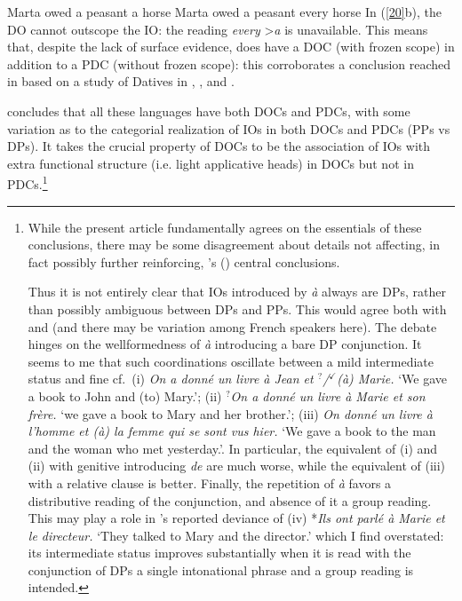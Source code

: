 \documentclass[output=paper]{langsci/langscibook}
\begin{document}
\ea \label{20}
    \ea Marta owed a peasant a horse
    \ex Marta owed a peasant every horse
    \z
\z
%
In (\ref{20}b), the DO cannot outscope the IO: the reading {\it every}
\textgreater {\it a} is unavailable. This means that, despite the lack of
surface evidence,   does have a \gls{DOC} (with frozen scope) in addition to a
    \gls{PDC} (without frozen scope):
    this corroborates a conclusion  reached in \cite{anagnostopoulou2005cross}
    based on a study of Datives in , , 
    and .\largerpage[-4]

\cite{anagnostopoulou2005cross} concludes that all these  languages have both
\glspl{DOC} and \glspl{PDC}, with some variation as to the categorial
realization of \glspl{IO} in both \glspl{DOC} and \glspl{PDC} (PPs vs DPs).  It
takes the crucial  property of \glspl{DOC} to be  the association of \glspl{IO}
with extra functional structure (i.e. light applicative heads) in \glspl{DOC}
but not in \glspl{PDC}.\footnote{While the present article fundamentally agrees
    on the essentials of these conclusions, there may be some disagreement
    about details not affecting, in fact possibly further reinforcing,
    \citeauthor{anagnostopoulou2005cross}'s
    (\citeyear{anagnostopoulou2005cross}) central conclusions.

    Thus it is not entirely clear that \glspl{IO} introduced by \emph{à} always
    are DPs, rather than possibly ambiguous between DPs and PPs. This would
    agree both with \cite{Kayne1975} and \cite{Vergnaud:1974} (and there may be
    variation among French speakers here). The debate hinges on the
    wellformedness of \emph{à} introducing a bare DP conjunction. It seems to
    me that such coordinations oscillate between a mild  intermediate status
    and fine cf.\ (i) \emph{On a donn\'e un livre \`a Jean et
        $^{?}$/$^{\checkmark}$(\`a) Marie.} \enquote*{We gave a book to John and
        (to) Mary.}; (ii) \emph{$^{?}$On a donn\'e un livre \`a Marie et son
        fr\`ere.} \enquote*{we gave a book to Mary and her brother.}; (iii)
        \emph{\checkmark On donn\'e un livre \`a l'homme et (\`a) la femme qui
    se sont vus hier.} \enquote*{We gave a book to the man and the woman who met
    yesterday.}. In particular, the equivalent of (i) and (ii) with
    genitive introducing {\it de} are much worse, while the
    equivalent of (iii) with a relative clause is better. Finally, the
    repetition of \emph{à} favors a distributive reading of the conjunction,
    and absence of it a group reading. This may play a role in
    \citeauthor{Jaeggli:1982}'s \citeyear{Jaeggli:1982} reported deviance of
    (iv) *\emph{Ils ont parl\'e \`a Marie et le directeur.} \enquote*{They talked to Mary
    and the director.} which I find overstated: its intermediate status improves
substantially when it is read with the conjunction of DPs a single intonational
phrase and a group reading is intended.}
\end{document}

